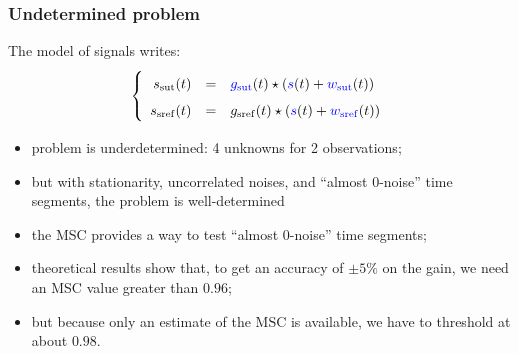 \documentclass[handout,9pt]{beamer}
\def\MSC{\text{MSC}}
\def\sut{\mathrm{sut}}
\def\sref{\mathrm{sref}}
\begin{document}
\begin{frame}
\frametitle{Undetermined problem}
The model of signals writes:
\begin{eqnarray*}
\left\{
\renewcommand\arraystretch{1.6}
\begin{array}{rcl}
s_{\sut}(t)&=&{\color{blue}g_{\sut}}(t)\star({\color{blue}s}(t)+{\color{blue}w_{\sut}}(t))
\\
s_{\sref}(t)&=&g_{\sref}(t)\star({\color{blue}s}(t)+{\color{blue}w_{\sref}}(t))
\end{array}\right.
\end{eqnarray*}
\begin{itemize}
\item
problem is underdetermined: 4 unknowns for 2 observations;
\item

but with stationarity, uncorrelated noises, and ``almost 0-noise'' time segments, the problem is well-determined

\item
 the MSC provides a way to test ``almost 0-noise'' time segments;
\item
theoretical results show that, to get an accuracy of $\pm 5\%$ on the gain, we need an MSC value greater than $0.96$;
\item
but because only an estimate of the $\MSC$ is available, we have to threshold at about $0.98$. %
\end{itemize}
\end{frame}
\end{document}
